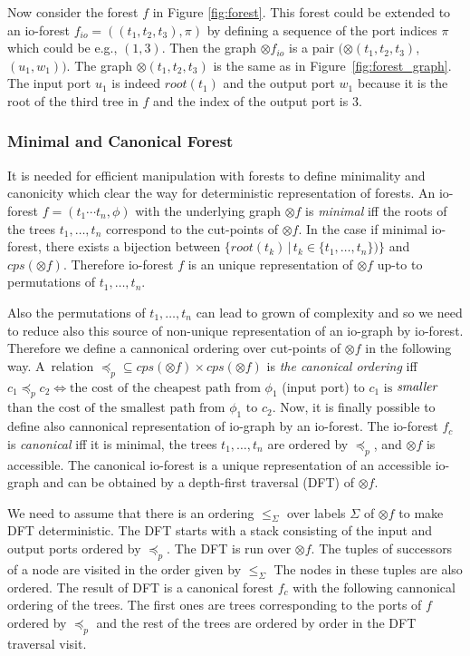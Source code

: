 \documentclass[a4paper, 12pt]{article}
\begin{document}
Now consider the forest $f$ in Figure \ref{fig:forest}.
This forest could be extended to an io-forest $f_{io}=((t_1,t_2,t_3),\pi)$ 
by defining a sequence of the port indices $\pi$ which could be e.g., $(1,3)$.
Then the graph $\otimes f_{io}$ is a pair $(\otimes (t_1,t_2,t_3)$, $(u_1,w_1))$.
The graph $\otimes (t_1,t_2,t_3)$ is the same as in Figure~\ref{fig:forest_graph}.
The input port $u_1$ is indeed $root(t_1)$
and the output port $w_1$ because it is the root of the third tree in $f$
and the index of the output port is $3$.
\label{ex:iograph}
\eexmp

\subsubsection{Minimal and Canonical Forest}
\label{subsec:mcforest}

It is needed for efficient manipulation with forests to define minimality and
canonicity which clear the way for deterministic representation of forests.
An io-forest $f=(t_1 \cdots t_n, \phi)$ with the underlying graph $\otimes f$ is \emph{minimal}
iff the roots of the trees $t_1,\ldots,t_n$ correspond to the cut-points of $\otimes f$.
In the case if minimal io-forest, there exists a bijection between
$\{root(t_k)\,|\, t_k \in \{t_1, \ldots, t_n\} )\}$ and $cps(\otimes f)$.
Therefore io-forest $f$ is an unique representation of $\otimes f$ up-to to permutations of $t_1,\ldots,t_n$.

Also the permutations of $t_1,\ldots,t_n$ can lead to grown of complexity and so
we need to reduce also this source of non-unique representation of an io-graph by io-forest.
Therefore we define a cannonical ordering over cut-points of $\otimes f$ in the following way.
A~relation ${\preceq_p} \subseteq {cps(\otimes f) \times cps(\otimes f)}$ is \emph{the canonical ordering}
iff $c_1 \preceq_p c_2 \Leftrightarrow \text{the cost of the cheapest path from }
\phi_1$ (input port) to $c_1 \text{ is}$ $\emph{smaller}$ $\text{than the cost of the smallest path from } \phi_1 \text{ to } c_2$.
Now, it is finally possible to define also cannonical representation of io-graph by an io-forest.
The io-forest $f_c$ is \emph{canonical} iff it is minimal, the trees $t_1,\ldots, t_n$ are ordered by $\preceq_p$, and $\otimes f$ is accessible.
The canonical io-forest is a unique representation of an accessible io-graph
and can be obtained by a depth-first traversal (DFT) of $\otimes f$.

We need to assume that there is an ordering $\leq_\Sigma$ over labels $\Sigma$ of $\otimes f$
to make DFT deterministic.
The DFT starts with a stack consisting of the input and output ports ordered by $\preceq_p$.
The DFT is run over $\otimes f$.
The tuples of successors of a node are visited in the order given by $\leq_{\Sigma}$
The nodes in these tuples are also ordered.
The result of DFT is a canonical forest $f_c$ with the following
cannonical ordering of the trees.
The first ones are trees corresponding to the ports of $f$ ordered by $\preceq_p$ and
the rest of the trees are ordered by order in the DFT traversal visit.
\end{document}
